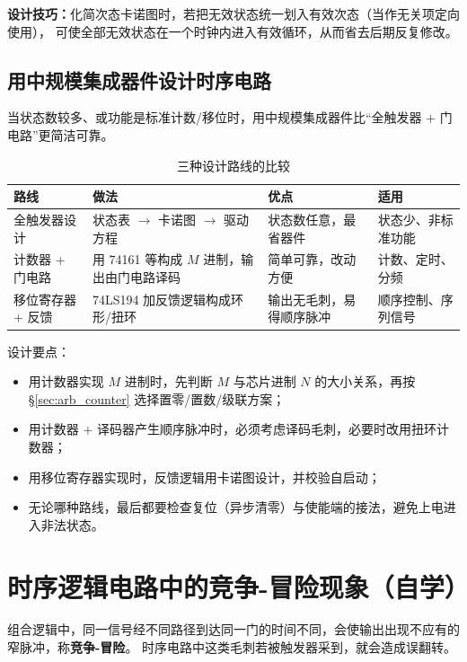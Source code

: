 \noindent\textbf{设计技巧：}化简次态卡诺图时，若把无效状态统一划入有效次态（当作无关项定向使用），
可使全部无效状态在一个时钟内进入有效循环，从而省去后期反复修改。

\subsection{用中规模集成器件设计时序电路}
当状态数较多、或功能是标准计数/移位时，用中规模集成器件比“全触发器 + 门电路”更简洁可靠。

\begin{table}[!htbp]
\centering
\caption{三种设计路线的比较}
\begin{tabular}{>{\raggedright\arraybackslash}p{2.8cm}>{\raggedright\arraybackslash}p{4.6cm}>{\raggedright\arraybackslash}p{3.6cm}>{\raggedright\arraybackslash}p{3.2cm}}
\toprule
路线 & 做法 & 优点 & 适用 \\
\midrule
全触发器设计 & 状态表 $\rightarrow$ 卡诺图 $\rightarrow$ 驱动方程 & 状态数任意，最省器件 & 状态少、非标准功能 \\
计数器 + 门电路 & 用 74161 等构成 $M$ 进制，输出由门电路译码 & 简单可靠，改动方便 & 计数、定时、分频 \\
移位寄存器 + 反馈 & 74LS194 加反馈逻辑构成环形/扭环 & 输出无毛刺，易得顺序脉冲 & 顺序控制、序列信号 \\
\bottomrule
\end{tabular}
\end{table}

\noindent 设计要点：
\begin{itemize}
    \item 用计数器实现 $M$ 进制时，先判断 $M$ 与芯片进制 $N$ 的大小关系，再按 \S\ref{sec:arb_counter} 选择置零/置数/级联方案；
    \item 用计数器 + 译码器产生顺序脉冲时，必须考虑译码毛刺，必要时改用扭环计数器；
    \item 用移位寄存器实现时，反馈逻辑用卡诺图设计，并校验自启动；
    \item 无论哪种路线，最后都要检查复位（异步清零）与使能端的接法，避免上电进入非法状态。
\end{itemize}

\section{时序逻辑电路中的竞争-冒险现象（自学）}
组合逻辑中，同一信号经不同路径到达同一门的时间不同，会使输出出现不应有的窄脉冲，称\textbf{竞争-冒险}。
时序电路中这类毛刺若被触发器采到，就会造成误翻转。

